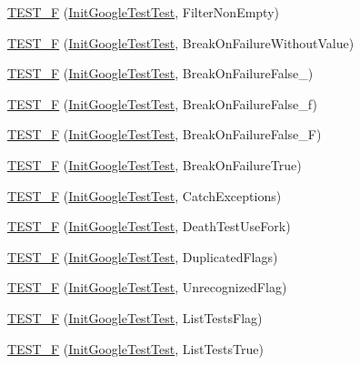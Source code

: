 \begin{DoxyCompactItemize}
\item 
\hyperlink{namespacetesting_a69dcb047e8cf4f93e8132faf11ba7110}{T\+E\+S\+T\+\_\+F} (\hyperlink{classtesting_1_1InitGoogleTestTest}{Init\+Google\+Test\+Test}, Filter\+Non\+Empty)
\item 
\hyperlink{namespacetesting_afc3e46c96f27aa2b502b15e8e4bab2ca}{T\+E\+S\+T\+\_\+F} (\hyperlink{classtesting_1_1InitGoogleTestTest}{Init\+Google\+Test\+Test}, Break\+On\+Failure\+Without\+Value)
\item 
\hyperlink{namespacetesting_abd2b3ac615374fbe560ba35be4c4e928}{T\+E\+S\+T\+\_\+F} (\hyperlink{classtesting_1_1InitGoogleTestTest}{Init\+Google\+Test\+Test}, Break\+On\+Failure\+False\+\_)
\item 
\hyperlink{namespacetesting_abb038e044a4f2142414624e482b48eeb}{T\+E\+S\+T\+\_\+F} (\hyperlink{classtesting_1_1InitGoogleTestTest}{Init\+Google\+Test\+Test}, Break\+On\+Failure\+False\+\_\+f)
\item 
\hyperlink{namespacetesting_aec19373865e49dbd1fe7f22c8db4a256}{T\+E\+S\+T\+\_\+F} (\hyperlink{classtesting_1_1InitGoogleTestTest}{Init\+Google\+Test\+Test}, Break\+On\+Failure\+False\+\_\+F)
\item 
\hyperlink{namespacetesting_aaf881d7ee8cfa238e9a66d0562937fde}{T\+E\+S\+T\+\_\+F} (\hyperlink{classtesting_1_1InitGoogleTestTest}{Init\+Google\+Test\+Test}, Break\+On\+Failure\+True)
\item 
\hyperlink{namespacetesting_af59442310531cd96d8aa3ce5acb2d025}{T\+E\+S\+T\+\_\+F} (\hyperlink{classtesting_1_1InitGoogleTestTest}{Init\+Google\+Test\+Test}, Catch\+Exceptions)
\item 
\hyperlink{namespacetesting_aa5259681257cd3654f34dc81212c82bc}{T\+E\+S\+T\+\_\+F} (\hyperlink{classtesting_1_1InitGoogleTestTest}{Init\+Google\+Test\+Test}, Death\+Test\+Use\+Fork)
\item 
\hyperlink{namespacetesting_a34b640eb46cf4189bed01f18d42d3277}{T\+E\+S\+T\+\_\+F} (\hyperlink{classtesting_1_1InitGoogleTestTest}{Init\+Google\+Test\+Test}, Duplicated\+Flags)
\item 
\hyperlink{namespacetesting_a1572c861f65ca8d5dfb61246a32a2799}{T\+E\+S\+T\+\_\+F} (\hyperlink{classtesting_1_1InitGoogleTestTest}{Init\+Google\+Test\+Test}, Unrecognized\+Flag)
\item 
\hyperlink{namespacetesting_a1d111e67e0c6411085ff6d0911f50d18}{T\+E\+S\+T\+\_\+F} (\hyperlink{classtesting_1_1InitGoogleTestTest}{Init\+Google\+Test\+Test}, List\+Tests\+Flag)
\item 
\hyperlink{namespacetesting_a000181c6b1ac347a3d7797324808ea8d}{T\+E\+S\+T\+\_\+F} (\hyperlink{classtesting_1_1InitGoogleTestTest}{Init\+Google\+Test\+Test}, List\+Tests\+True)

\end{DoxyCompactItemize}
